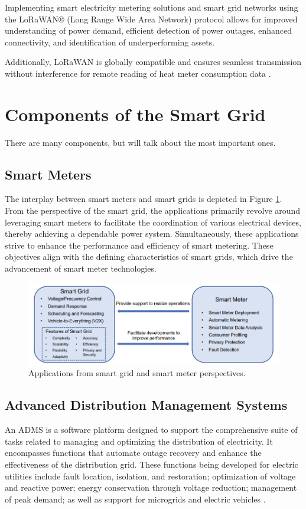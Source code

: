  Implementing smart electricity metering solutions and smart grid networks using the LoRaWAN® (Long Range Wide Area Network) protocol allows for improved understanding of power demand, efficient detection of power outages, enhanced connectivity, and identification of underperforming assets.
 
 Additionally, LoRaWAN is globally compatible and ensures seamless transmission without interference for remote reading of heat meter consumption data \cite{WhatIsSmartgrid}.
\section{Components of the Smart Grid }  
There are many components, but will talk about the most important ones.
\subsection{Smart Meters}
The interplay between smart meters and smart grids is depicted in Figure \ref{fig:SmartMeter}. From the perspective of the smart grid, the applications primarily revolve around leveraging smart meters to facilitate the coordination of various electrical devices, thereby achieving a dependable power system. Simultaneously, these applications strive to enhance the performance and efficiency of smart metering. These objectives align with the defining characteristics of smart grids, which drive the advancement of smart meter technologies.\cite{chen2023control}
\begin{figure}[h]
	\centering
	\includegraphics[width=\textwidth]{figures/SmartMeter.PNG}
	\caption{Applications from smart grid and smart meter perspectives. \cite{chen2023control}}
	\label{fig:SmartMeter}
\end{figure}
\subsection{Advanced Distribution Management Systems }
An ADMS is a software platform designed to support the comprehensive suite of tasks related to managing and optimizing the distribution of electricity. It encompasses functions that automate outage recovery and enhance the effectiveness of the distribution grid. These functions being developed for electric utilities include fault location, isolation, and restoration; optimization of voltage and reactive power; energy conservation through voltage reduction; management of peak demand; as well as support for microgrids and electric vehicles \cite{avazov2016advanced}.

